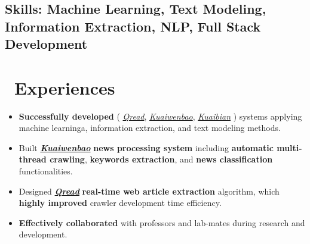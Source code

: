 \documentclass{resume}
\begin{document}
\subsection{\textbf{Skills:} Machine Learning, Text Modeling, Information Extraction, NLP, Full Stack Development}


\section{\faUsers\ Experiences}

\begin{itemize}
    \item \textbf{Successfully developed}
    (
    \href{https://chrome.google.com/webstore/detail/qread/fnbofbgccclppkhjihfcjjmabngmmflh}{\textit{Qread}},
    \href{http://www.kuaiwenbao.com}{\textit{Kuaiwenbao}},
    \href{http://kuaibianbao.com/english/index.php}{\textit{Kuaibian}}
    )
    systems applying machine learninga, information extraction, and text modeling methods.

	\item Built \href{http://www.kuaiwenbao.com}{\textbf{\textit{Kuaiwenbao}}}
	\textbf{news processing system} including
	\textbf{automatic multi-thread crawling}, \textbf{keywords extraction}, and \textbf{news classification} functionalities.

	\item Designed \href{https://chrome.google.com/webstore/detail/qread/fnbofbgccclppkhjihfcjjmabngmmflh}{\textbf{\textit{Qread}}}
	\textbf{real-time web article extraction} algorithm, which \textbf{highly improved} crawler development time efficiency.

    \item \textbf{Effectively collaborated} with professors and lab-mates during research and development.
\end{itemize}
\end{document}
